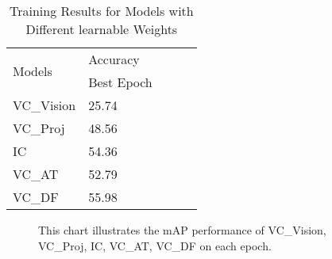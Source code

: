 \begin{table}[ht]
    \centering
    \caption{Training Results for Models with Different learnable Weights}
    \label{tab:ablation_vc}
    \begin{tabular}{lllll}
        \toprule
        \multirow{2}{*}{Models} & Accuracy \\
        \cmidrule{2-2} 
        {} &  Best Epoch \\
        \midrule
        VC\_Vision & 25.74 \\
        VC\_Proj   & 48.56 \\
        IC         & 54.36 \\
        VC\_AT     & 52.79 \\
        VC\_DF     & 55.98 \\
        \bottomrule
    \end{tabular}
\end{table}

\begin{figure}[ht]
    \centering
    \resizebox{1.0\textwidth}{!}{}
    \caption[mAP performance on each epoch of VC\_Vision, VC\_Proj, IC, VC\_AT, VC\_DF on each epoch]{This chart illustrates the mAP performance of VC\_Vision, VC\_Proj, IC, VC\_AT, VC\_DF on each epoch.}
    \label{fig:ablation_vc}
\end{figure}



